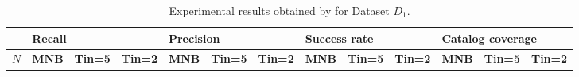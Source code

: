 \begin{table*}[]
	\small
\caption{Experimental results obtained by \TFb for Dataset $D_{1}$.}
\begin{tabular}{|l | lll| lll |lll |lll|}
	\hline
	& \multicolumn{3}{l|}{\textbf{Recall}} & \multicolumn{3}{l|}{\textbf{Precision}} & \multicolumn{3}{l|}{\textbf{Success rate}} & \multicolumn{3}{l|}{ \textbf{Catalog coverage}} \\ \hline
	$N$  & \textbf{MNB}     & \textbf{Tin=5}   & \textbf{Tin=2}  & \textbf{MNB}      & \textbf{Tin=5 }   & \textbf{Tin=2}   & \textbf{MNB}       & \textbf{Tin=5 }   & \textbf{Tin=2}    & \textbf{MNB}        & \textbf{Tin=5 }     & \textbf{Tin=2}      \\ \hline
                   

\end{tabular}
\end{table*}
